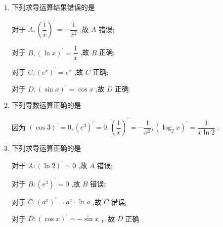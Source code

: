 \begin{enumerate}
    \begin{enumerate}
    \item 下列求导运算结果错误的是

    \begin{jieda}
        对于 ${A},{\left( \dfrac{1}{x}\right) }^{\prime } =  - \dfrac{1}{{x}^{2}}$ ,故 ${A}$ 错误;
        
        对于 ${B},{\left( \ln x\right) }^{\prime } = \dfrac{1}{x}$ ,故 ${B}$ 正确;
        
        对于 ${C},{\left( {{e}}^{x}\right) }^{\prime } = {{e}}^{x}$ ,故 ${C}$ 正确;
        
        对于 ${D},{\left( \sin x\right) }^{\prime } = \cos x$ ,故 ${D}$ 正确.
    \end{jieda}
    
    \item 下列导数运算正确的是

    \begin{jieda}
        因为 ${\left( \cos 3\right) }^{\prime } = 0,{\left( {{e}}^{3}\right) }^{\prime } = 0,{\left( \dfrac{1}{x}\right) }^{\prime } =  - \dfrac{1}{{x}^{2}},{\left( {\log }_{2}x\right) }^{\prime } = \dfrac{1}{x\ln 2}$ .
    \end{jieda}
    
    \item 下列求导运算正确的是
    \begin{jieda}
        对于 ${A} : {\left( \ln 2\right) }^{\prime } = 0$ ,故 ${A}$ 错误;
        
        对于 ${B} : {\left( {{e}}^{3}\right) }^{\prime } = 0$ ,故 ${B}$ 错误;
        
        对于 ${C} : {\left( {a}^{x}\right) }^{\prime } = {a}^{x} \cdot  \ln a$ ,故 ${C}$ 错误;
        
        对于 ${D} : {\left( \cos x\right) }^{\prime } =  - \sin x$ ，故 ${D}$ 正确
    \end{jieda}
    

\end{enumerate}
\end{enumerate}
